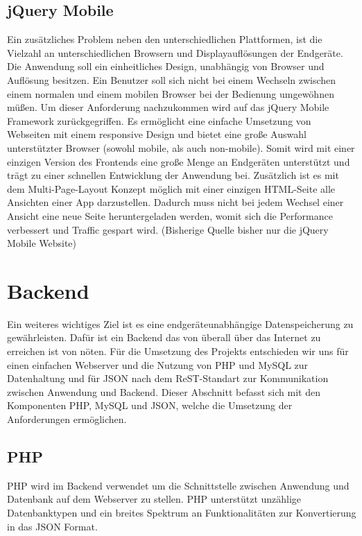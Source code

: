\documentclass[10pt, conference, compsocconf]{IEEEtran}
\begin{document}
\subsection{jQuery Mobile}
Ein zus\"atzliches Problem neben den unterschiedlichen Plattformen, ist die Vielzahl an unterschiedlichen Browsern und Displayaufl\"osungen der Endger\"ate. Die Anwendung soll ein einheitliches Design, unabh\"angig von Browser und Aufl\"osung besitzen. Ein Benutzer soll sich nicht bei einem Wechseln zwischen einem normalen und einem mobilen Browser bei der Bedienung umgew\"ohnen m\"u{\ss}en. Um dieser Anforderung nachzukommen wird auf das jQuery Mobile Framework zur\"uckgegriffen. Es erm\"oglicht eine einfache Umsetzung von Webseiten mit einem responsive Design und bietet eine gro{\ss}e Auswahl unterst\"utzter Browser (sowohl mobile, als auch non-mobile). Somit wird mit einer einzigen Version des Frontends eine gro{\ss}e Menge an Endger\"aten unterst\"utzt und tr\"agt zu einer schnellen Entwicklung der Anwendung bei. Zus\"atzlich ist es mit dem Multi-Page-Layout Konzept m\"oglich mit einer einzigen HTML-Seite alle Ansichten einer App darzustellen. Dadurch muss nicht bei jedem Wechsel einer Ansicht eine neue Seite heruntergeladen werden, womit sich die Performance verbessert und Traffic gespart wird. (Bisherige Quelle bisher nur die jQuery Mobile Website)

\section{Backend}
Ein weiteres wichtiges Ziel ist es eine endger\"ateunabh\"angige Datenspeicherung zu gew\"ahrleisten. Daf\"ur ist ein Backend das von \"uberall \"uber das Internet zu erreichen ist von n\"oten. F\"ur die Umsetzung des Projekts entschieden wir uns f\"ur einen einfachen Webserver und die Nutzung von PHP und MySQL zur Datenhaltung und f\"ur JSON nach dem ReST-Standart zur Kommunikation zwischen Anwendung und Backend.  Dieser Abschnitt befasst sich mit den Komponenten PHP, MySQL und JSON, welche die Umsetzung der Anforderungen erm\"oglichen.

\subsection{PHP}
PHP wird im Backend verwendet um die Schnittstelle zwischen Anwendung und Datenbank auf dem Webserver zu stellen. PHP unterst\"utzt unz\"ahlige Datenbanktypen und ein breites Spektrum an Funktionalit\"aten zur Konvertierung in das JSON Format.
\end{document}
